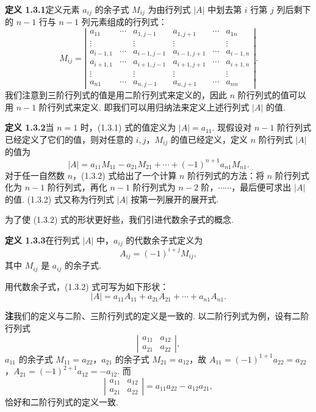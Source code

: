 \documentclass[UTF8,12pt,a4paper,fontset=fandol]{ctexart}
\begin{document}
\noindent\textbf{定义 1.3.1}\quad 定义元素 $a_{ij}$ 的余子式 $M_{ij}$ 为由行列式 $|A|$ 中划去第 $i$ 行第 $j$ 列后剩下的 $n-1$ 行与 $n-1$ 列元素组成的行列式：
\[
M_{ij}=
\left|\begin{array}{cccccc}
a_{11} & \cdots & a_{1,j-1} & a_{1,j+1} & \cdots & a_{1n}\\
\vdots & & \vdots & \vdots & & \vdots\\
a_{i-1,1} & \cdots & a_{i-1,j-1} & a_{i-1,j+1} & \cdots & a_{i-1,n}\\
a_{i+1,1} & \cdots & a_{i+1,j-1} & a_{i+1,j+1} & \cdots & a_{i+1,n}\\
\vdots & & \vdots & \vdots & & \vdots\\
a_{n1} & \cdots & a_{n,j-1} & a_{n,j+1} & \cdots & a_{nn}
\end{array}\right|.
\]
我们注意到三阶行列式的值是用二阶行列式来定义的，因此 $n$ 阶行列式的值可以用 $n-1$ 阶行列式来定义. 即我们可以用归纳法来定义上述行列式 $|A|$ 的值.

\noindent\textbf{定义 1.3.2}\quad 当 $n=1$ 时，(1.3.1) 式的值定义为 $|A|=a_{11}$. 现假设对 $n-1$ 阶行列式已经定义了它们的值，则对任意的 $i,j$，$M_{ij}$ 的值已经定义，定义 $n$ 阶行列式 $|A|$ 的值为
\begin{equation}
|A|=a_{11}M_{11}-a_{21}M_{21}+\cdots+(-1)^{n+1}a_{n1}M_{n1}.
\tag{1.3.2}
\end{equation}
对于任一自然数 $n$，(1.3.2) 式给出了一个计算 $n$ 阶行列式的方法：将 $n$ 阶行列式化为 $n-1$ 阶行列式，再化 $n-1$ 阶行列式为 $n-2$ 阶，$\cdots\cdots$，最后便可求出 $|A|$ 的值. (1.3.2) 式又称为行列式 $|A|$ 按第一列展开的展开式.

为了使 (1.3.2) 式的形状更好些，我们引进代数余子式的概念.

\noindent\textbf{定义 1.3.3}\quad 在行列式 $|A|$ 中，$a_{ij}$ 的代数余子式定义为
\[
A_{ij}=(-1)^{i+j}M_{ij},
\]
其中 $M_{ij}$ 是 $a_{ij}$ 的余子式.

用代数余子式，(1.3.2) 式可写为如下形状：
\begin{equation}
|A|=a_{11}A_{11}+a_{21}A_{21}+\cdots+a_{n1}A_{n1}.
\tag{1.3.3}
\end{equation}

\noindent\textbf{注}\quad 我们的定义与二阶、三阶行列式的定义是一致的. 以二阶行列式为例，设有二阶行列式
\[
\left|\begin{array}{cc}
a_{11} & a_{12}\\
a_{21} & a_{22}
\end{array}\right|,
\]
$a_{11}$ 的余子式 $M_{11}=a_{22}$，$a_{21}$ 的余子式 $M_{21}=a_{12}$，故 $A_{11}=(-1)^{1+1}a_{22}=a_{22}$，$A_{21}=(-1)^{2+1}a_{12}=-a_{12}$. 而
\[
\left|\begin{array}{cc}
a_{11} & a_{12}\\
a_{21} & a_{22}
\end{array}\right|=a_{11}a_{22}-a_{12}a_{21},
\]
恰好和二阶行列式的定义一致.
\end{document}
